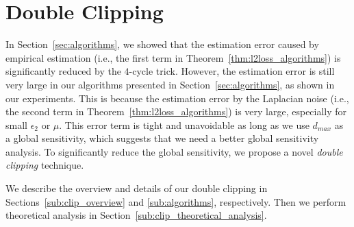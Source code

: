 \section{Double Clipping}
\label{sec:double_clip}

In Section~\ref{sec:algorithms}, 
we showed that the estimation error caused by empirical estimation (i.e., the first term in Theorem~\ref{thm:l2loss_algorithms}) is significantly reduced by the $4$-cycle trick. 
However, 
the estimation error is 
still very large in our algorithms presented in Section~\ref{sec:algorithms}, as shown in our experiments. 
This is because 
the estimation error by the Laplacian noise (i.e., the second term in Theorem~\ref{thm:l2loss_algorithms}) 
is very large, especially for small $\epsilon_2$ or 
$\mu$. 
This error term is tight and unavoidable as long as we use $d_{max}$ as a global sensitivity, which suggests that we need a better global sensitivity analysis.
% 
To significantly reduce the global sensitivity, we propose a novel \textit{double clipping} technique. 

We describe the overview and details of our double clipping in Sections~\ref{sub:clip_overview} and \ref{sub:algorithms}, respectively. 
Then we perform theoretical analysis in Section~\ref{sub:clip_theoretical_analysis}.

